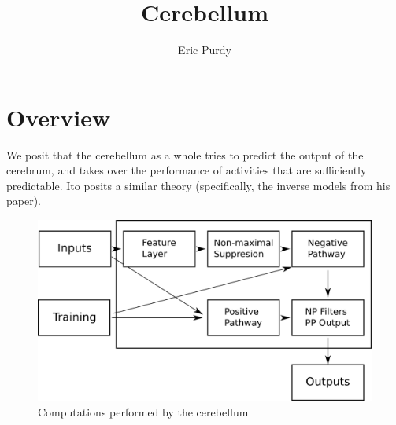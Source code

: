 \documentclass{article}
\title{Cerebellum} \author{Eric Purdy}
\theoremstyle{definition}
\begin{document}
\maketitle

\section{Overview}

We posit that the cerebellum as a whole tries to predict the output of
the cerebrum, and takes over the performance of activities that are
sufficiently predictable. Ito \cite{ito} posits a similar theory
(specifically, the inverse models from his paper).

\begin{figure}
\includegraphics[width=\linewidth]{computation.png}
\caption{Computations performed by the cerebellum}
\label{fig-computation}
\end{figure}
\end{document}
